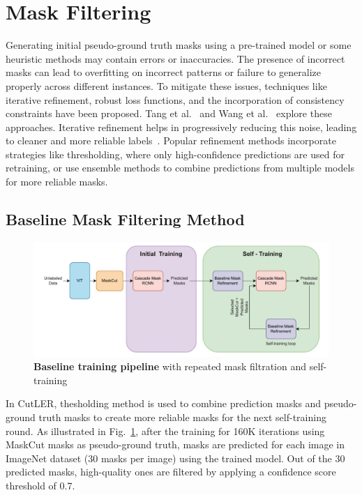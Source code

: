 \section{Mask Filtering}
Generating initial pseudo-ground truth masks using a pre-trained model or some heuristic methods may contain errors or inaccuracies. The presence of incorrect masks can lead to overfitting on incorrect patterns or failure to generalize properly across different instances. To mitigate these issues, techniques like iterative refinement, robust loss functions, and the incorporation of consistency constraints have been proposed. Tang et al.~\cite{Tang_2018_CVPR} and Wang et al.~\cite{ziegler2022selfsupervisedlearningobjectparts} explore these approaches. Iterative refinement helps in progressively reducing this noise, leading to cleaner and more reliable labels~\cite{xie2020selftrainingnoisystudentimproves}. Popular refinement methods incorporate strategies like thresholding, where only high-confidence predictions are used for retraining, or use ensemble methods to combine predictions from multiple models for more reliable masks.

\subsection{Baseline Mask Filtering Method}
\label{sec:baseline_mask_filteration}

\begin{figure}
	\centering
	\includegraphics[width=1\textwidth]{Images/main/baseline_approach.pdf}
	\caption[\textbf{Baseline Training Pipeline}]{\textbf{Baseline training pipeline} with repeated mask filtration and self-training}
	\label{fig:baseline_training}
\end{figure}

In CutLER, thesholding method is used to combine prediction masks and pseudo-ground truth masks to create more reliable masks for the next self-training round. As illustrated in Fig.~\ref{fig:baseline_training}, after the training for 160K iterations using MaskCut masks as pseudo-ground truth, masks are predicted for each image in ImageNet dataset (30 masks per image) using the trained model. Out of the 30 predicted masks, high-quality ones are filtered by applying a confidence score threshold of 0.7.

